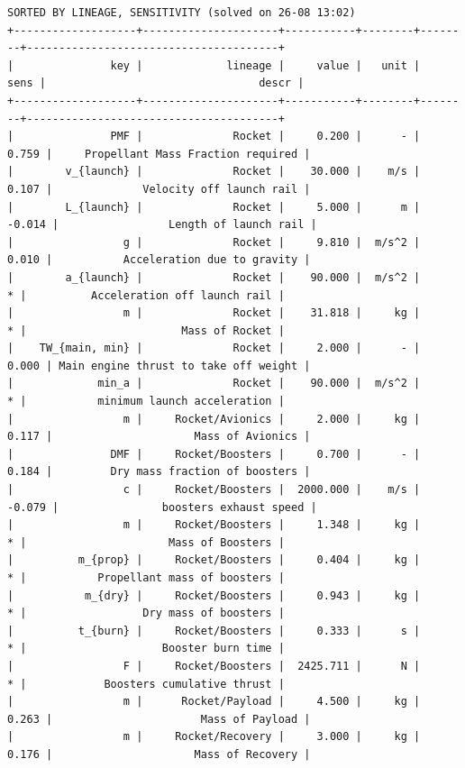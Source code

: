 \documentclass[12pt]{article}
\begin{document}
\begin{landscape}

\begin{verbatim}
SORTED BY LINEAGE, SENSITIVITY (solved on 26-08 13:02)
+-------------------+---------------------+-----------+--------+--------+---------------------------------------+
|               key |             lineage |     value |   unit |   sens |                                 descr |
+-------------------+---------------------+-----------+--------+--------+---------------------------------------+
|               PMF |              Rocket |     0.200 |      - |  0.759 |     Propellant Mass Fraction required |
|        v_{launch} |              Rocket |    30.000 |    m/s |  0.107 |              Velocity off launch rail |
|        L_{launch} |              Rocket |     5.000 |      m | -0.014 |                 Length of launch rail |
|                 g |              Rocket |     9.810 |  m/s^2 |  0.010 |           Acceleration due to gravity |
|        a_{launch} |              Rocket |    90.000 |  m/s^2 |      * |          Acceleration off launch rail |
|                 m |              Rocket |    31.818 |     kg |      * |                        Mass of Rocket |
|    TW_{main, min} |              Rocket |     2.000 |      - |  0.000 | Main engine thrust to take off weight |
|             min_a |              Rocket |    90.000 |  m/s^2 |      * |           minimum launch acceleration |
|                 m |     Rocket/Avionics |     2.000 |     kg |  0.117 |                      Mass of Avionics |
|               DMF |     Rocket/Boosters |     0.700 |      - |  0.184 |         Dry mass fraction of boosters |
|                 c |     Rocket/Boosters |  2000.000 |    m/s | -0.079 |                boosters exhaust speed |
|                 m |     Rocket/Boosters |     1.348 |     kg |      * |                      Mass of Boosters |
|          m_{prop} |     Rocket/Boosters |     0.404 |     kg |      * |           Propellant mass of boosters |
|           m_{dry} |     Rocket/Boosters |     0.943 |     kg |      * |                  Dry mass of boosters |
|          t_{burn} |     Rocket/Boosters |     0.333 |      s |      * |                     Booster burn time |
|                 F |     Rocket/Boosters |  2425.711 |      N |      * |            Boosters cumulative thrust |
|                 m |      Rocket/Payload |     4.500 |     kg |  0.263 |                       Mass of Payload |
|                 m |     Rocket/Recovery |     3.000 |     kg |  0.176 |                      Mass of Recovery |

\end{verbatim}
\end{landscape}
\end{document}
